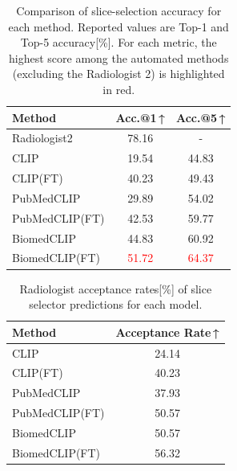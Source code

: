 \documentclass[bioengineering,article,submit,pdftex,moreauthors]{Definitions/mdpi}
\begin{document}
\begin{table}[ht]
  \centering
  \caption{Comparison of slice-selection accuracy for each method. 
  Reported values are Top-1 and Top-5 accuracy[\%]. 
  For each metric, the highest score among the automated methods (excluding the Radiologist 2) is highlighted in red.}
  \label{tab:slice_extraction_accuracy}
  \begin{tabular}{lcc}
    \toprule
    Method                  & Acc.@1\,↑      & Acc.@5\,↑      \\
    \midrule
    Radiologist2            & 78.16       & -           \\
    CLIP                    & 19.54       & 44.83       \\
    CLIP(FT)                & 40.23       & 49.43       \\
    PubMedCLIP              & 29.89       & 54.02       \\
    PubMedCLIP(FT)          & 42.53       & 59.77       \\
    BiomedCLIP              & 44.83       & 60.92       \\
    BiomedCLIP(FT)          & \textcolor{red}{51.72} & \textcolor{red}{64.37} \\
    \bottomrule
  \end{tabular}
\end{table}


\begin{table}[ht]
  \centering
  \caption{Radiologist acceptance rates[\%] of slice selector predictions for each model.}
  \label{tab:slice_selector_adoption}
  \begin{tabular}{lc}
    \toprule
    Method                  & Acceptance Rate\,↑ \\
    \midrule
    CLIP                    & 24.14        \\
    CLIP(FT)                & 40.23        \\
    PubMedCLIP              & 37.93        \\
    PubMedCLIP(FT)          & 50.57        \\
    BiomedCLIP              & 50.57        \\
    BiomedCLIP(FT)          & 56.32        \\
    \bottomrule
  \end{tabular}
\end{table}
\end{document}
